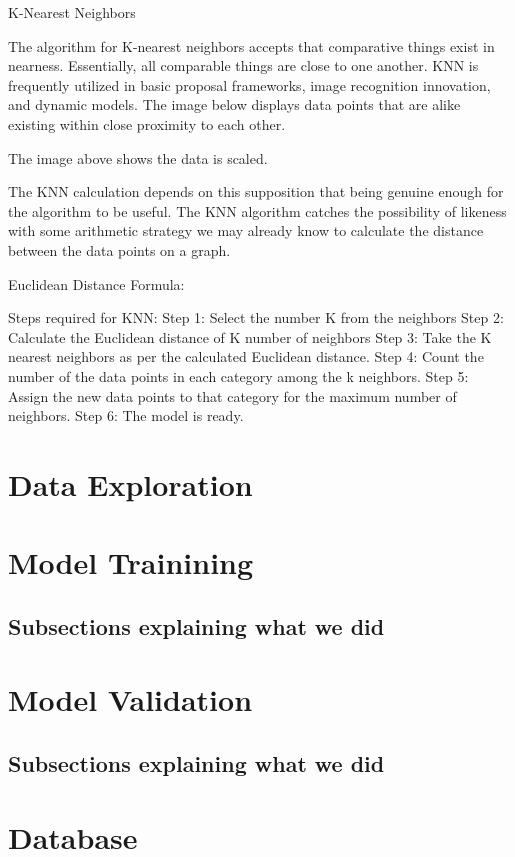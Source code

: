 \documentclass[a4paper,12pt]{report}
\begin{document}
K-Nearest Neighbors
 
The algorithm for K-nearest neighbors accepts that comparative things exist in nearness. Essentially, all comparable things are close to one another. KNN is frequently utilized in basic proposal frameworks, image recognition innovation, and dynamic models. The image below displays data points that are alike existing within close proximity to each other.




The image above shows the data is scaled.




The KNN calculation depends on this supposition that being genuine enough for the algorithm to be useful. The KNN algorithm catches the possibility of likeness with some arithmetic strategy we may already know to calculate the distance between the data points on a graph.


Euclidean Distance Formula:


Steps required for KNN:
Step 1: Select the number K from the neighbors
Step 2: Calculate the Euclidean distance of K number of neighbors
Step 3: Take the K nearest neighbors as per the calculated Euclidean distance.
Step 4: Count the number of the data points in each category among the k neighbors.
Step 5: Assign the new data points to that category for the maximum number of neighbors.
Step 6: The model is ready.

\section{Data Exploration}
\section{Model Trainining}
\subsection{Subsections explaining what we did}
\section{Model Validation}
\subsection{Subsections explaining what we did}
\section{Database}
\end{document}
